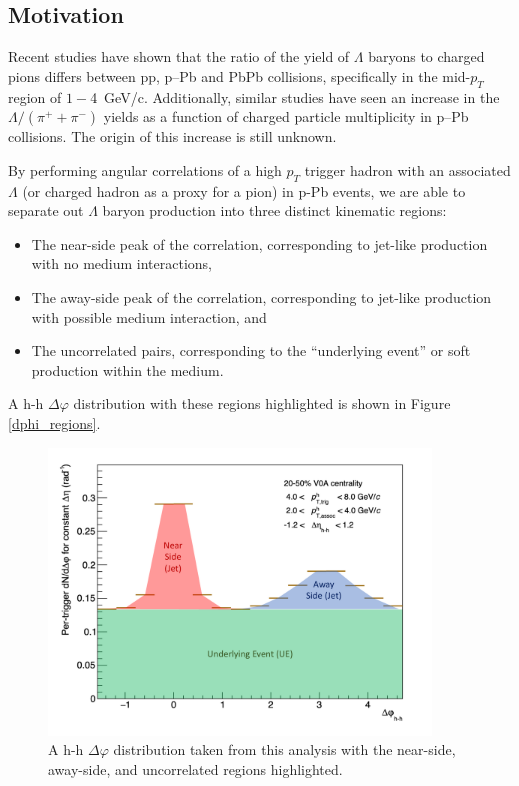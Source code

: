 \documentclass[ALICE,manyauthors]{ALICE_analysis_notes}
\begin{document}
\subsection{Motivation}
Recent studies have shown that the ratio of the yield of $\Lambda$ baryons to charged pions differs between pp, p--Pb and PbPb collisions, specifically in the mid-$p_T$ region of $1-$\SI{4}{GeV/c}.  Additionally, similar studies have seen an increase in the $\Lambda/(\pi^{+} + \pi^{-})$ yields as a function of charged particle multiplicity in p--Pb collisions. The origin of this increase is still unknown.

By performing angular correlations of a high $p_T$ trigger hadron with an associated $\Lambda$ (or charged hadron as a proxy for a pion) in p-Pb events, we are able to separate out $\Lambda$ baryon production into three distinct kinematic regions:
\begin{itemize}
\item The near-side peak of the correlation, corresponding to jet-like production with no medium interactions,
\item The away-side peak of the correlation, corresponding to jet-like production with possible medium interaction, and
\item The uncorrelated pairs, corresponding to the ``underlying event'' or soft production within the medium.
\end{itemize}

A h-h $\Delta\varphi$ distribution with these regions highlighted is shown in Figure \ref{dphi_regions}. 

\begin{figure}
\centering
\includegraphics[width=4in]{figures/dphi_regions.pdf}
\caption{A h-h $\Delta\varphi$ distribution taken from this analysis with the near-side, away-side, and uncorrelated regions highlighted.}
\end{figure}
\end{document}

